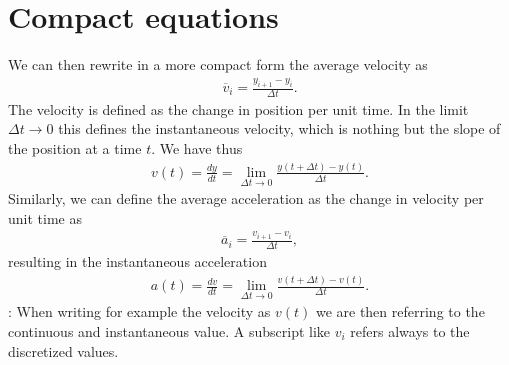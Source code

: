 \documentclass[letterpaper,10pt,english]{sphinxmanual}
\begin{document}
\section{Compact equations}
\label{\detokenize{chapter1:compact-equations}}
We can then rewrite in a more compact form the average velocity as
\begin{equation*}
\begin{split}
\overline{v}_i = \frac{y_{i+1}-y_{i}}{\Delta t}.
\end{split}
\end{equation*}
The velocity is defined as the change in position per unit time.
In the limit \(\Delta t \rightarrow 0\) this defines the instantaneous velocity, which is nothing but the slope of the position at a time \(t\).
We have thus
\begin{equation*}
\begin{split}
v(t) = \frac{dy}{dt}=\lim_{\Delta t \rightarrow 0}\frac{y(t+\Delta t)-y(t)}{\Delta t}.
\end{split}
\end{equation*}
Similarly, we can define the average acceleration as the change in velocity per unit time as
\begin{equation*}
\begin{split}
\overline{a}_i = \frac{v_{i+1}-v_{i}}{\Delta t},
\end{split}
\end{equation*}
resulting in the instantaneous acceleration
\begin{equation*}
\begin{split}
a(t) = \frac{dv}{dt}=\lim_{\Delta t\rightarrow 0}\frac{v(t+\Delta t)-v(t)}{\Delta t}.
\end{split}
\end{equation*}
: When writing for example the velocity as \(v(t)\) we are then referring to the continuous and instantaneous value. A subscript like
\(v_i\) refers always to the discretized values.
\end{document}
